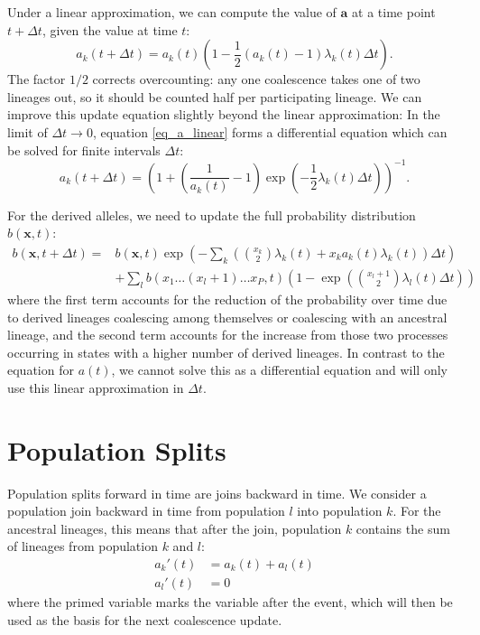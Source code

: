 \documentclass[a4paper]{article}
\begin{document}
Under a linear approximation, we can compute the value of $\mathbf{a}$ at a time point $t+\Delta t$, given the value at time $t$:
\begin{equation}
    \label{eq_a_linear}
a_k(t+\Delta t) = a_k(t) \left(1 - \frac{1}{2}(a_k(t) - 1)\lambda_{k}(t) \Delta t\right).
\end{equation}
The factor $1/2$ corrects overcounting: any one coalescence takes one of two lineages out, so it should be counted half per participating lineage. We can improve this update equation slightly beyond the linear approximation: In the limit of $\Delta t \rightarrow 0$, equation \ref{eq_a_linear} forms a differential equation which can be solved for finite intervals $\Delta t$:
\begin{equation}
a_k(t+\Delta t) = \left(1 + \left(\frac{1}{a_k(t)}-1\right) \exp\left(-\frac{1}{2}\lambda_k(t)\Delta t\right)\right)^{-1}.
\end{equation}

For the derived alleles, we need to update the full probability distribution $b(\mathbf{x},t)$:
\begin{equation}
\begin{split}
     b(\mathbf{x}, t+\Delta t) = & b(\mathbf{x}, t) \exp\left( -\sum_k \left(\binom{x_k}{2}\lambda_k(t) +
                         x_k a_k(t) \lambda_k(t)   \right)\Delta t \right)\\
     & + \sum_l b(x_1\ldots (x_l+1)\ldots x_P, t) \left(1-\exp\left(
                     \binom{x_l + 1}{2}\lambda_l(t)\Delta t\right)  \right)
\end{split}
\end{equation}
where the first term accounts for the reduction of the probability over time due to derived lineages coalescing among themselves or coalescing with an ancestral lineage, and the second term accounts for the increase from those two processes occurring in states with a higher number of derived lineages. In contrast to the equation for $a(t)$, we cannot solve this as a differential equation and will only use this linear approximation in $\Delta t$.

\section{Population Splits}
Population splits forward in time are joins backward in time. We consider a population join backward in time from population $l$ into population $k$. For the ancestral lineages, this means that after the join, population $k$ contains the sum of lineages from population $k$ and $l$:
\begin{align}
    a_k'(t) &= a_k(t) + a_l(t)\\
    a_l'(t) &= 0
\end{align}
where the primed variable marks the variable after the event, which will then be used as the basis for the next coalescence update.
\end{document}
